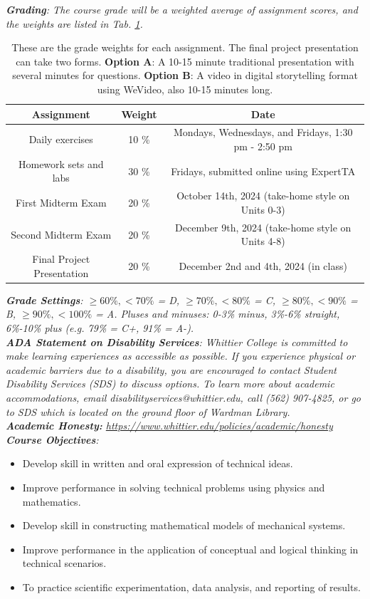\documentclass[10pt]{article}
\begin{document}
\textit{\textbf{Grading}: The course grade will be a weighted average of assignment scores, and the weights are listed in Tab. \ref{tab:grades}.}
\begin{table}
\centering
\begin{tabular}{| c | c | c |}
\hline
\textbf{Assignment} & \textbf{Weight} & \textbf{Date} \\ \hline
Daily exercises & 10 \% & Mondays, Wednesdays, and Fridays, 1:30 pm - 2:50 pm \\ \hline
Homework sets and labs & 30 \% & Fridays, submitted online using ExpertTA \\ \hline
First Midterm Exam & 20 \% & October 14th, 2024 (take-home style on Units 0-3) \\ \hline
Second Midterm Exam & 20 \% & December 9th, 2024 (take-home style on Units 4-8) \\ \hline
Final Project Presentation & 20 \% & December 2nd and 4th, 2024 (in class) \\ \hline
\end{tabular}
\caption{\label{tab:grades} These are the grade weights for each assignment. The final project presentation can take two forms.  \textbf{Option A}: A 10-15 minute traditional presentation with several minutes for questions.  \textbf{Option B}: A video in digital storytelling format using WeVideo, also 10-15 minutes long.}
\end{table}
\noindent
\textit{\textbf{Grade Settings}: $\geq 60\%, <70\%$ = D, $\geq 70\%, <80\%$ = C, $\geq 80\%, <90\%$ = B, $\geq 90\%, <100\%$ = A. Pluses and minuses: 0-3\% minus, 3\%-6\% straight, 6\%-10\% plus (e.g. 79\% = C+, 91\% = A-).} \\
\textit{\textbf{ADA Statement on Disability Services}: Whittier College is committed to make learning experiences as accessible as possible. If you experience physical or academic barriers due to a disability, you are encouraged to contact Student Disability Services (SDS) to discuss options. To learn more about academic accommodations, email disabilityservices@whittier.edu, call (562) 907-4825, or go to SDS which is located on the ground floor of Wardman Library.} \\
\textit{\textbf{Academic Honesty:} \url{https://www.whittier.edu/policies/academic/honesty}} \\
\noindent
\textit{\textbf{Course Objectives}:}
\begin{itemize}
\item Develop skill in written and oral expression of technical ideas.
\item Improve performance in solving technical problems using physics and mathematics.
\item Develop skill in constructing mathematical models of mechanical systems.
\item Improve performance in the application of conceptual and logical thinking in technical scenarios.
\item To practice scientific experimentation, data analysis, and reporting of results.
\end{itemize}
\end{document}
